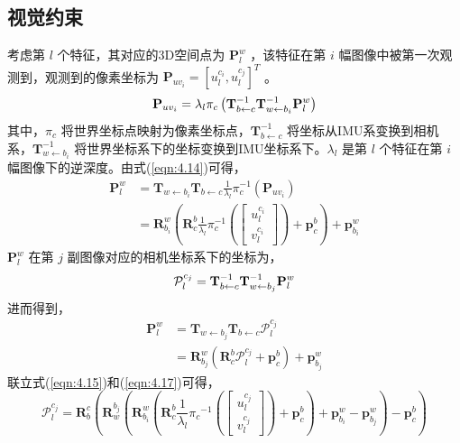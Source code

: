 \subsection{视觉约束}
考虑第  $l$ 个特征，其对应的3D空间点为 $\mathbf{P}_l^{w} $ ，该特征在第 $i$  幅图像中被第一次观测到，观测到的像素坐标为 $ \mathbf{P}_{uv_{i}} =[u_l^{c_i},u_l^{c_j}]^{T} $ 。
\begin{equation}
\label{eqn:4.14}
\setlength{\abovedisplayskip}{6pt}
\setlength{\belowdisplayskip}{6pt}
\mathbf{P}_{uv_{i}}  =\lambda_{l} \pi_{c}\left( \mathbf{T}_{b \leftarrow c}^{-1} \mathbf{T}_{w \leftarrow b_{i}}^{-1} \mathbf{P}^w_{l}\right)
\end{equation}
其中，$\pi_{c} $ 将世界坐标点映射为像素坐标点，$\mathbf{T}_{b \leftarrow c}^{-1} $ 将坐标从IMU系变换到相机系，$\mathbf{T}_{w \leftarrow b_{i}}^{-1} $ 将世界坐标系下的坐标变换到IMU坐标系下。$\lambda_l $ 是第 $l$ 个特征在第 $i$ 幅图像下的逆深度。由式(\ref{eqn:4.14})可得，
\begin{equation}
\label{eqn:4.15}
\begin{aligned}
\mathbf{P}^w_{l} &= \mathbf{T}_{w\leftarrow b_{i}} \mathbf{T}_{b\leftarrow c} \frac{1}{\lambda_{l}} \pi_{c}^{-1}\left( \mathbf{P}_{uv_{i}} \right) \\
&= \mathbf{R}_{b_{i}}^{w}\left(\mathbf{R}_{c}^{b} \frac{1}{\lambda_{l}} \pi_{c}^{-1}
\left(\left[ \begin{array}
{c}{u_{l}^{c_{i}}} \\ {v_{l}^{c_{i}}}
\end{array}\right]\right)
+ \mathbf{p}_{c}^{b}\right)+\mathbf{p}_{b_{i}}^{w}
\end{aligned}
\end{equation}
 $\mathbf{P}_l^{w} $ 在第 $j$ 副图像对应的相机坐标系下的坐标为，
\begin{equation}
\label{eqn:4.16}
\setlength{\abovedisplayskip}{6pt}
\setlength{\belowdisplayskip}{6pt}
\mathcal{ P}_{l}^{c_{j}}=\mathbf{T}_{b \leftarrow c}^{-1} \mathbf{T}_{w \leftarrow b_{j}}^{-1} \mathbf{P}_{l}^{w}
\end{equation}
进而得到，
\begin{equation}
\label{eqn:4.17}
\begin{aligned}
\mathbf{ P}_{l}^{w} &= \mathbf{T}_{w \leftarrow b_{j}} \mathbf{T}_{b \leftarrow c} \mathcal{P}_{l}^{c_{j}} \\
&= \mathbf{R}_{b_{j}}^{w}\left(\mathbf{R}_{c}^{b} \mathcal{P}_{l}^{c_{j}}+\mathbf{p}_{c}^{b}\right)+\mathbf{p}_{b_{j}}^{w}
\end{aligned}
\end{equation}
联立式(\ref{eqn:4.15})和(\ref{eqn:4.17})可得，
\begin{equation}
\label{eqn:4.18}
\mathcal{P}_l^{c_j}=\mathbf{R}_b^c(\mathbf{R}_w^{b_j}(\mathbf{R}_{b_i}^w(\mathbf{R}_c^b\frac{1}{\lambda_l}{\pi_c}^{-1}(\begin{bmatrix}  u_l^{c_j} \\ v_l^{c_j}
\end{bmatrix})+\mathbf{p}_c^b)+\mathbf{p}_{b_i}^w-\mathbf{p}_{b_j}^w)-\mathbf{p}_c^b)
\end{equation}

